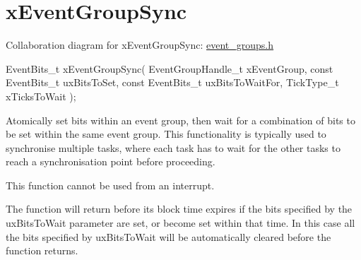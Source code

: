 \hypertarget{group__x_event_group_sync}{}\section{x\+Event\+Group\+Sync}
\label{group__x_event_group_sync}
Collaboration diagram for x\+Event\+Group\+Sync\+:
\hyperlink{event__groups_8h}{event\+\_\+groups.\+h} 
\begin{DoxyPre}
   EventBits\_t xEventGroupSync( EventGroupHandle\_t xEventGroup,
                                const EventBits\_t uxBitsToSet,
                                const EventBits\_t uxBitsToWaitFor,
                                TickType\_t xTicksToWait );
\end{DoxyPre}


Atomically set bits within an event group, then wait for a combination of bits to be set within the same event group. This functionality is typically used to synchronise multiple tasks, where each task has to wait for the other tasks to reach a synchronisation point before proceeding.

This function cannot be used from an interrupt.

The function will return before its block time expires if the bits specified by the ux\+Bits\+To\+Wait parameter are set, or become set within that time. In this case all the bits specified by ux\+Bits\+To\+Wait will be automatically cleared before the function returns.


